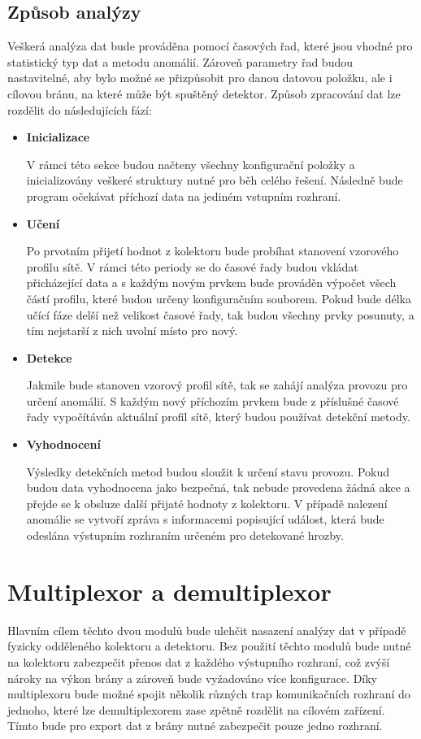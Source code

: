 
 \subsection{Způsob analýzy}
 Veškerá analýza dat bude prováděna pomocí časových řad, které jsou vhodné pro statistický typ 
 dat a metodu anomálií. Zároveň parametry řad budou nastavitelné, aby bylo možné se přizpůsobit
 pro danou datovou položku, ale i cílovou bránu, na které může být spuštěný detektor. Způsob 
 zpracování dat lze rozdělit do následujících fází:
  \begin{itemize}
   \item \textbf{Inicializace}
   
   V rámci této sekce budou načteny všechny konfigurační položky a inicializovány veškeré struktury
   nutné pro běh celého řešení. Následně bude program očekávat příchozí data na jediném vstupním
   rozhraní.
   
   \newpage
   \item \textbf{Učení}
   
   Po prvotním přijetí hodnot z kolektoru bude probíhat stanovení vzorového profilu sítě. V rámci
   této periody se do časové řady budou vkládat přicházející data a s každým novým prvkem 
   bude prováděn výpočet všech částí profilu, které budou určeny konfiguračním souborem.
   Pokud bude délka učící fáze delší než velikost 
   časové řady, tak budou všechny prvky posunuty, a tím nejstarší z nich uvolní místo pro nový.
   
   \item \textbf{Detekce}
   
   Jakmile bude stanoven vzorový profil sítě, tak se zahájí analýza provozu pro určení anomálií.
   S každým nový příchozím prvkem bude z příslušné časové řady vypočítáván aktuální profil sítě,
   který budou používat detekční metody. 
   
   \item \textbf{Vyhodnocení}
   
   Výsledky detekčních metod budou sloužit k určení stavu provozu. Pokud budou data vyhodnocena jako
   bezpečná, tak nebude provedena žádná akce a přejde se k obsluze další přijaté hodnoty z kolektoru.
   V případě nalezení anomálie se vytvoří zpráva s informacemi popisující událost, která bude 
   odeslána výstupním rozhraním určeném pro detekované hrozby.   
  \end{itemize}
  
 \section{Multiplexor a demultiplexor}
 Hlavním cílem těchto dvou modulů bude ulehčit nasazení analýzy dat v případě fyzicky odděleného
 kolektoru a detektoru. Bez použití těchto modulů bude nutné na kolektoru zabezpečit přenos dat
 z každého výstupního rozhraní, což zvýší nároky na výkon brány a zároveň bude vyžadováno
 více konfigurace. Díky multiplexoru bude možné spojit několik různých trap komunikačních 
 rozhraní do jednoho, které lze demultiplexorem zase zpětně rozdělit na cílovém zařízení.
 Tímto bude pro export dat z brány nutné zabezpečit pouze jedno rozhraní.

